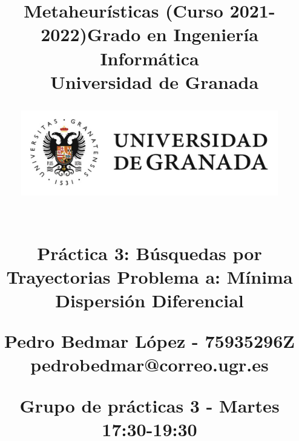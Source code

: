 



\title{	
\normalfont \normalsize 
\huge{\textbf{Metaheurísticas (Curso 2021-2022)}\linebreak \linebreak Grado en Ingeniería Informática \\ Universidad de Granada} \\ [23pt] %

\begin{figure}[H] %
    \centering
        \includegraphics[scale=0.4]{img/ugr.png}
\end{figure}

\horrule{0.5pt} \\[0.4cm] %
\huge Práctica 3: Búsquedas por Trayectorias \linebreak \linebreak%
\LARGE Problema a: Mínima Dispersión Diferencial
\horrule{2pt} \\[0.5cm] %
\vspace{0.7cm}

\Large{Pedro Bedmar López - 75935296Z} \\
\Large{pedrobedmar@correo.ugr.es} \linebreak

\large Grupo de prácticas 3 - Martes 17:30-19:30

}

\date{}




